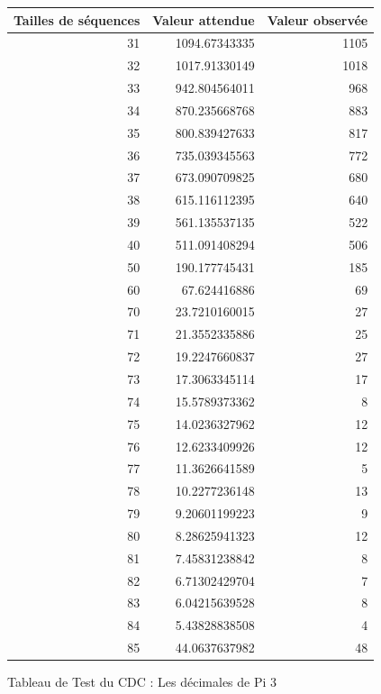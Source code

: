 \documentclass[10pt,a4paper]{article}
\begin{document}
\begin{figure}[h]
\centering
\begin{tabular}{|r|r|r|}
\hline
Tailles de séquences & Valeur attendue & Valeur observée\\
\hline
31 & 1094.67343335 & 1105\\
32 & 1017.91330149 & 1018\\
33 & 942.804564011 & 968\\
34 & 870.235668768 & 883\\
35 & 800.839427633 & 817\\
36 & 735.039345563 & 772\\
37 & 673.090709825 & 680\\
38 & 615.116112395 & 640\\
39 & 561.135537135 & 522\\
40 & 511.091408294 & 506\\
50 & 190.177745431 & 185\\
60 & 67.624416886 & 69\\
70 & 23.7210160015 & 27\\
71 & 21.3552335886 & 25\\
72 & 19.2247660837 & 27\\
73 & 17.3063345114 & 17\\
74 & 15.5789373362 & 8\\
75 & 14.0236327962 & 12\\
76 & 12.6233409926 & 12\\
77 & 11.3626641589 & 5\\
78 & 10.2277236148 & 13\\
79 & 9.20601199223 & 9\\
80 & 8.28625941323 & 12\\
81 & 7.45831238842 & 8\\
82 & 6.71302429704 & 7\\
83 & 6.04215639528 & 8\\
84 & 5.43828838508 & 4\\
85 & 44.0637637982 & 48\\
\hline
\end{tabular}
\caption{Tableau de Test du CDC : Les décimales de Pi 3}
\end{figure}

\end{document}
